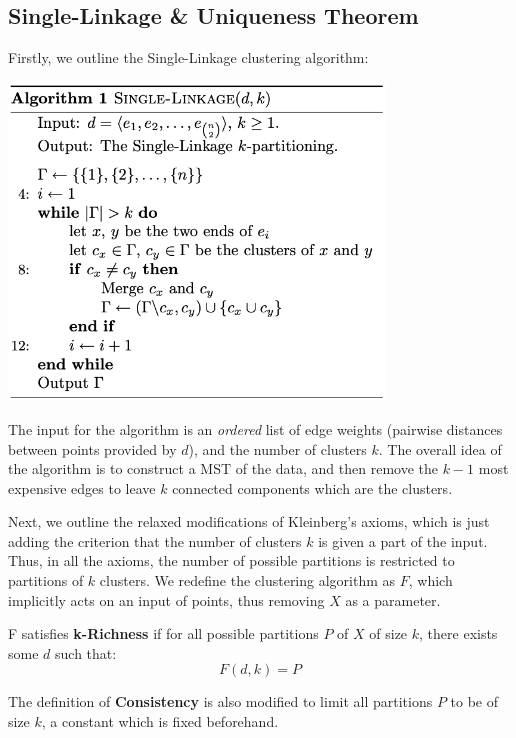 \subsection{Single-Linkage \& Uniqueness Theorem}

\medskip

Firstly, we outline the Single-Linkage clustering algorithm:

\begin{center}
    \includegraphics[width = 10cm]{chapter_4/files/single_linkage.png}
\end{center}

The input for the algorithm is an \textit{ordered} list of edge weights (pairwise distances between points provided by $d$), and the number of clusters $k$. The overall idea of the algorithm is to construct a MST of the data, and then remove the $k-1$ most expensive edges to leave $k$ connected components which are the clusters.

\medskip

Next, we outline the relaxed modifications of Kleinberg's axioms, which is just adding the criterion that the number of clusters $k$ is given a part of the input. Thus, in all the axioms, the number of possible partitions is restricted to partitions of $k$ clusters. We redefine the clustering algorithm as $F$, which implicitly acts on an input of points, thus removing $X$ as a parameter.

\begin{definition}
    F satisfies \textbf{k-Richness} if for all possible partitions $P$ of $X$ of size $k$, there exists some $d$ such that:
    $$
    F(d, k) = P
    $$
\end{definition}

The definition of \textbf{Consistency} is also modified to limit all partitions $P$ to be of size $k$, a constant which is fixed beforehand.

